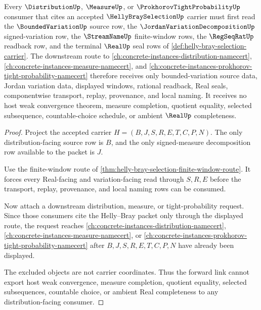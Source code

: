 \begin{theorem}
\label{thm:helly-bray-selection-distribution-forward-link}
Every $\DistributionUp$, $\MeasureUp$, or $\ProkhorovTightProbabilityUp$ consumer that cites an accepted $\HellyBraySelectionUp$ carrier must first read the $\BoundedVariationUp$ source row, the $\JordanVariationDecompositionUp$ signed-variation row, the $\StreamNameUp$ finite-window rows, the $\RegSeqRatUp$ readback row, and the terminal $\RealUp$ seal rows of \autoref{def:helly-bray-selection-carrier}. The downstream route to \autoref{ch:concrete-instances-distribution-namecert}, \autoref{ch:concrete-instances-measure-namecert}, and \autoref{ch:concrete-instances-prokhorov-tight-probability-namecert} therefore receives only bounded-variation source data, Jordan variation data, displayed windows, rational readback, Real seals, componentwise transport, replay, provenance, and local naming. It receives no host weak convergence theorem, measure completion, quotient equality, selected subsequence, countable-choice schedule, or ambient $\RealUp$ completeness.
\end{theorem}
\begin{proof}
Project the accepted carrier $H=(B,J,S,R,E,T,C,P,N)$. The only distribution-facing source row is $B$, and the only signed-measure decomposition row available to the packet is $J$.

Use the finite-window route of \autoref{thm:helly-bray-selection-finite-window-route}. It forces every Real-facing and variation-facing read through $S,R,E$ before the transport, replay, provenance, and local naming rows can be consumed.

Now attach a downstream distribution, measure, or tight-probability request. Since those consumers cite the Helly--Bray packet only through the displayed route, the request reaches \autoref{ch:concrete-instances-distribution-namecert}, \autoref{ch:concrete-instances-measure-namecert}, or \autoref{ch:concrete-instances-prokhorov-tight-probability-namecert} after $B,J,S,R,E,T,C,P,N$ have already been displayed.

The excluded objects are not carrier coordinates. Thus the forward link cannot export host weak convergence, measure completion, quotient equality, selected subsequences, countable choice, or ambient Real completeness to any distribution-facing consumer.
\end{proof}


